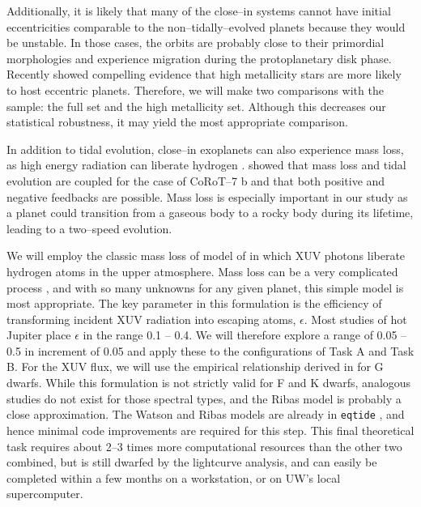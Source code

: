Additionally, it is likely that many of the close--in systems cannot
have initial eccentricities comparable to the non--tidally--evolved
planets because they would be unstable.  In those cases, the orbits
are probably close to their primordial morphologies and experience
migration during the protoplanetary disk phase.  Recently
\cite{DawsonMurrayClay13} showed compelling evidence that high
metallicity stars are more likely to host eccentric planets.
Therefore, we will make two comparisons with the \kepler sample: the
full set and the high metallicity set.  Although this decreases our
statistical robustness, it may yield the most appropriate comparison.

\medskip
{\centerline{}}
\smallskip

In addition to tidal evolution, close--in exoplanets can also
experience mass loss, as high energy radiation can liberate hydrogen
\citep{Watson81,VidalMadjar04}.  \cite{Jackson10} showed that mass
loss and tidal evolution are coupled for the case of CoRoT--7 b and
that both positive and negative feedbacks are possible.  Mass loss is
especially important in our study as a planet could transition from a
gaseous body to a rocky body during its lifetime, leading to a
two--speed evolution.

We will employ the classic mass loss of model of \cite{Watson81} in
which XUV photons liberate hydrogen atoms in the upper atmosphere.
Mass loss can be a very complicated process
\citep{Yelle04,Lammer07,Khodachenko07,Leitzinger11,Lammer13}, and with
so many unknowns for any given planet, this simple model is most
appropriate.  The key parameter in this formulation is the efficiency
of transforming incident XUV radiation into escaping atoms,
$\epsilon$.  Most studies of hot Jupiter place $\epsilon$ in the range
0.1 -- 0.4.  We will therefore explore a range of 0.05 -- 0.5 in
increment of 0.05 and apply these to the configurations of Task A and
Task B.  For the XUV flux, we will use the empirical relationship
derived in \cite{Ribas05} for G dwarfs.  While this formulation is not
strictly valid for F and K dwarfs, analogous studies do not exist for
those spectral types, and the Ribas model is probably a close
approximation.  The Watson and Ribas models are already in
\texttt{eqtide} \citep{Barnes13}, and hence minimal code improvements
are required for this step.  This final theoretical task requires
about 2--3 times more computational resources than the other two
combined, but is still dwarfed by the \kepler lightcurve analysis, and
can easily be completed within a few months on a workstation, or on
UW's local supercomputer.

